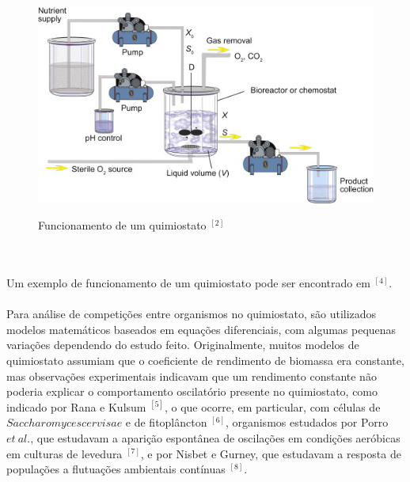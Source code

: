 \documentclass{article}
\begin{document}
\begin{figure}[H]
        \centering
        \hbox{\hspace{7.0em} \includegraphics[scale=1.0] {Funcionamento_Quimiostato.jpg}} 
        \caption*{Funcionamento de um quimiostato $^{[2]}$}
\end{figure}
\\\\Um exemplo de funcionamento de um quimiostato pode ser encontrado em $^{[4]}$.
\\\\Para análise de competições entre organismos no quimiostato, são utilizados modelos matemáticos baseados em equações diferenciais, com algumas pequenas variações dependendo do estudo feito. Originalmente, muitos modelos de quimiostato assumiam que o coeficiente de rendimento de biomassa era constante, mas observações experimentais indicavam que um rendimento constante não poderia explicar o comportamento oscilatório presente no quimiostato, como indicado por Rana e Kulsum $^{[5]}$, o que ocorre, em particular, com células de $Saccharomyces cervisae$ e de fitoplâncton $^{[6]}$, organismos estudados por Porro $et \ al.$, que estudavam a aparição espontânea de oscilações em condições aeróbicas em culturas de levedura $^{[7]}$, e por Nisbet e Gurney, que estudavam a resposta de populações a flutuações ambientais contínuas $^{[8]}$. 
\end{document}
